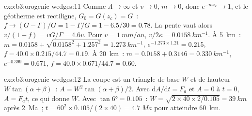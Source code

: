 \begin{solution}{exo:b3:orogenic-wedges:11}
Comme $\Lambda \to \infty$ et $v \to 0$, $m \to 0$, donc $e^{-mz_c} \to 1$, et
le géotherme est rectiligne, $G_0 = G(z_c) = G$~: $f \to (G - \Gamma)/G = 1 -
\Gamma/G = 1 - 6.5/30 = 0.78$. La pente vaut alors $v/(1 - f) = vG/\Gamma =
4.6v$. Pour $v = \qty{1}{mm/an}$, $v/2\kappa = \qty{0.0158}{km^{-1}}$. À
\qty{5}{km}~: $m = 0.0158 + \sqrt{0.0158^2 + 1.257^2} = \qty{1.273}{km^{-1}}$,
$e^{-1.273\times1.21} = 0.215$, $f = 40.0\times0.215/44.7 = 0.19$. À
\qty{20}{km}~: $m = 0.0158 + 0.3146 = \qty{0.330}{km^{-1}}$, $e^{-0.399} =
0.671$, $f = 40.0\times0.671/44.7 = 0.60$.
\end{solution}

\begin{solution}{exo:b3:orogenic-wedges:12}
La coupe est un triangle de base $W$ et de hauteur $W\tan(\alpha + \beta)$~:
$A = W^2\tan(\alpha + \beta)/2$. Avec $\mathrm dA/\mathrm dt = F_a$ et $A =
0$ à $t = 0$, $A = F_at$, ce qui donne $W$. Avec $\tan\ang{6} = 0.105$~:
$W = \sqrt{2\times40\times2/0.105} = \qty{39}{km}$ après \qty{2}{Ma}~; $t =
60^2\times0.105/(2\times40) = \qty{4.7}{Ma}$ pour atteindre \qty{60}{km}.
\end{solution}

